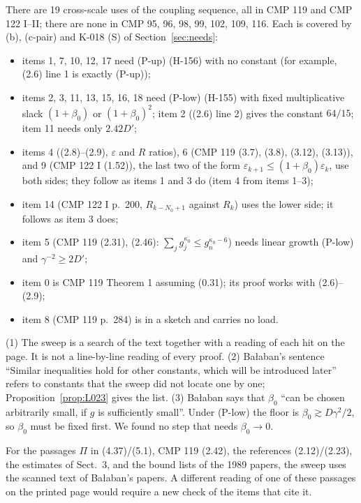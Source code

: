\begin{proposition}
There are 19 cross-scale uses of the coupling sequence, all in CMP 119 and CMP 122 I--II; there are none in CMP 95, 96, 98, 99, 102, 109, 116. Each is covered by (b), (c-pair) and K-018 (S) of Section~\ref{sec:needs}:
\begin{itemize}
\item items 1, 7, 10, 12, 17 need (P-up) (H-156) with no constant (for example, (2.6) line 1 is exactly (P-up));
\item items 2, 3, 11, 13, 15, 16, 18 need (P-low) (H-155) with fixed multiplicative slack $(1+\beta_0)$ or $(1+\beta_0)^2$; item 2 ((2.6) line 2) gives the constant $64/15$; item 11 needs only $2.42D'$;
\item items 4 ((2.8)--(2.9), $\varepsilon$ and $R$ ratios), 6 (CMP 119 (3.7), (3.8), (3.12), (3.13)), and 9 (CMP 122 I (1.52)), the last two of the form $\varepsilon_{k+1}\le(1+\beta_0)\varepsilon_k$, use both sides; they follow as items 1 and 3 do (item 4 from items 1--3);
\item item 14 (CMP 122 I p.\ 200, $R_{k-N_0+1}$ against $R_k$) uses the lower side; it follows as item 3 does;
\item item 5 (CMP 119 (2.31), (2.46): $\sum_j g_j^{\kappa_0}\le g_n^{\kappa_0-6}$) needs linear growth (P-low) and $\gamma^{-2}\ge 2D'$;
\item item 0 is CMP 119 Theorem 1 assuming (0.31); its proof works with (2.6)--(2.9);
\item item 8 (CMP 119 p.\ 284) is in a sketch and carries no load.
\end{itemize}
\end{proposition}

\begin{remark}
(1) The sweep is a search of the text together with a reading of each hit on the page. It is not a line-by-line reading of every proof. (2) Ba{\l}aban's sentence ``Similar inequalities hold for other constants, which will be introduced later'' \cite[p.~256]{balaban119} refers to constants that the sweep did not locate one by one; Proposition~\ref{prop:L023} gives the list. (3) Ba{\l}aban says that $\beta_0$ ``can be chosen arbitrarily small, if $g$ is sufficiently small''. Under (P-low) the floor is $\beta_0\gtrsim D\gamma^2/2$, so $\beta_0$ must be fixed first. We found no step that needs $\beta_0\to 0$.
\end{remark}

\begin{convention}\label{conv:sweepocr}
For the passages $\Pi$ in (4.37)/(5.1), CMP 119 (2.42), the references (2.12)/(2.23), the estimates of Sect.~3, and the bound lists of the 1989 papers, the sweep uses the scanned text of Ba{\l}aban's papers. A different reading of one of these passages on the printed page would require a new check of the items that cite it.
\end{convention}

